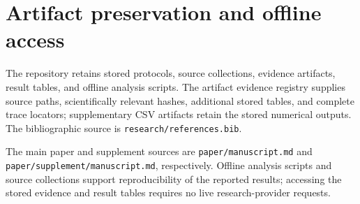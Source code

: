 \documentclass[conference]{IEEEtran}
\newcommand{\codeurl}[1]{{\def\UrlFont{\ttfamily}\nolinkurl{#1}}}
\begin{document}
\section{Artifact preservation and offline access}

{\raggedright The repository retains stored protocols, source collections, evidence artifacts, result tables, and offline analysis scripts. The artifact evidence registry supplies source paths, scientifically relevant hashes, additional stored tables, and complete trace locators; supplementary CSV artifacts retain the stored numerical outputs. The bibliographic source is \codeurl{research/references.bib}.\par}


{\raggedright The main paper and supplement sources are \codeurl{paper/manuscript.md} and \codeurl{paper/supplement/manuscript.md}, respectively. Offline analysis scripts and source collections support reproducibility of the reported results; accessing the stored evidence and result tables requires no live research-provider requests.\par}

\end{document}
